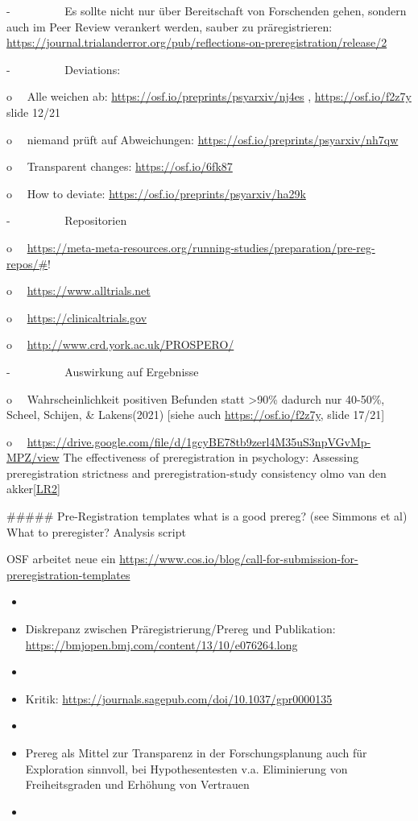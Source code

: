 \documentclass[
  letterpaper,
  DIV=11,
  numbers=noendperiod]{scrreprt}
\begin{document}
-~~~~~~~~~ Es sollte nicht nur über Bereitschaft von Forschenden gehen,
sondern auch im Peer Review verankert werden, sauber zu präregistrieren:
\url{https://journal.trialanderror.org/pub/reflections-on-preregistration/release/2}

-~~~~~~~~~ Deviations:

o~~ Alle weichen ab: \url{https://osf.io/preprints/psyarxiv/nj4es} ,
\url{https://osf.io/f2z7y} slide 12/21

o~~ niemand prüft auf Abweichungen:
\url{https://osf.io/preprints/psyarxiv/nh7qw}

o~~ Transparent changes: \url{https://osf.io/6fk87}

o~~ How to deviate: \url{https://osf.io/preprints/psyarxiv/ha29k}

-~~~~~~~~~ Repositorien

o~~
\href{https://meta-meta-resources.org/running-studies/preparation/pre-reg-repos/}{https://meta-meta-resources.org/running-studies/preparation/pre-reg-repos/\#}!

o~~ \url{https://www.alltrials.net}

o~~ \url{https://clinicaltrials.gov}

o~~ \url{http://www.crd.york.ac.uk/PROSPERO/}

-~~~~~~~~~ Auswirkung auf Ergebnisse

o~~ Wahrscheinlichkeit positiven Befunden statt \textgreater90\% dadurch
nur 40-50\%, Scheel, Schijen, \& Lakens(2021) {[}siehe auch
\url{https://osf.io/f2z7y}, slide 17/21{]}

o~~
\url{https://drive.google.com/file/d/1gcyBE78tb9zerl4M35uS3npVGvMp-MPZ/view}
The effectiveness of preregistration in psychology: Assessing
preregistration strictness and preregistration-study consistency olmo
van den akker\hyperref[_msocom_2]{{[}LR2{]}}~

\#\#\#\#\# Pre-Registration templates what is a good prereg? (see
Simmons et al) What to preregister? Analysis script

OSF arbeitet neue ein
\url{https://www.cos.io/blog/call-for-submission-for-preregistration-templates}

\begin{itemize}
\item
\item
  Diskrepanz zwischen Präregistrierung/Prereg und Publikation:
  \url{https://bmjopen.bmj.com/content/13/10/e076264.long}
\item
\item
  Kritik: \url{https://journals.sagepub.com/doi/10.1037/gpr0000135}
\item
\item
  Prereg als Mittel zur Transparenz in der Forschungsplanung auch für
  Exploration sinnvoll, bei Hypothesentesten v.a. Eliminierung von
  Freiheitsgraden und Erhöhung von Vertrauen
\item
\end{itemize}
\end{document}
